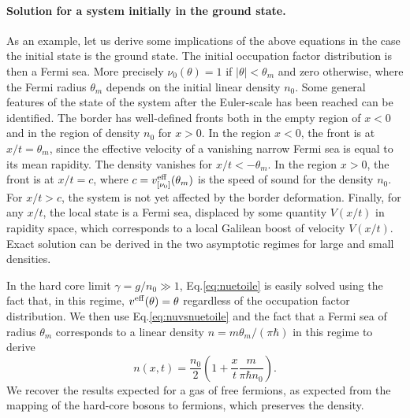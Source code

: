 \documentclass[submission, Phys]{SciPost}
\begin{document}
\paragraph{Solution for a system initially in the ground state.}
As an example, let us derive some implications of the above equations in the case the  initial state is the ground 
state. The initial occupation factor distribution is then a Fermi sea. More precisely $\nu_0(\theta)=1$ if $|\theta| < \theta_m$ and zero otherwise, where the Fermi radius $\theta_m$ depends on the initial linear density $n_0$. 
Some general features of the state of the system after the 
Euler-scale has been reached can be identified. The border has well-defined  
fronts both in the empty region of $x<0$ and in the region of density
$n_0$ for $x>0$. In the region $x<0$, the front is at 
$x/t =\theta_m$, since the effective velocity of a vanishing narrow Fermi sea is equal to its mean rapidity. The density vanishes for $x/t<-\theta_m$. In the region $x>0$, the front is at $x/t = c$, where $c=v^{\rm eff}_{[\nu_0]}(\theta_m)$ is the speed of sound for the density $n_0$. For $x/t>c$, the system is not yet affected by the border deformation.  Finally, for any $x/t$, the local state is a  Fermi sea, displaced by some quantity $V(x/t)$ in rapidity space, which corresponds to a local Galilean boost of velocity $V(x/t)$.
Exact solution can be derived in the two asymptotic regimes for large and small densities. 

In the hard core limit $\gamma=g/n_0\gg 1$, Eq.\eqref{eq:nuetoile} is easily solved using the fact that, in this regime, $v^{\rm eff} (\theta)=\theta$ 
regardless of the occupation factor distribution. We then use Eq.\eqref{eq:nuvsnuetoile} and the fact that a Fermi sea of radius $\theta_m$ corresponds to a linear density $n=m\theta_m/(\pi\hbar)$ in this regime to derive 
\begin{equation}
    n(x,t)=\frac{n_0}{2} \left ( 1 + \frac{x}{t} \frac{m}{\pi \hbar n_0} \right ).
\end{equation}
We recover the results expected for a gas of free fermions, as expected from the mapping of the hard-core bosons to fermions, which preserves the density\cite{girardeau_relationship_1960}. 
\end{document}

